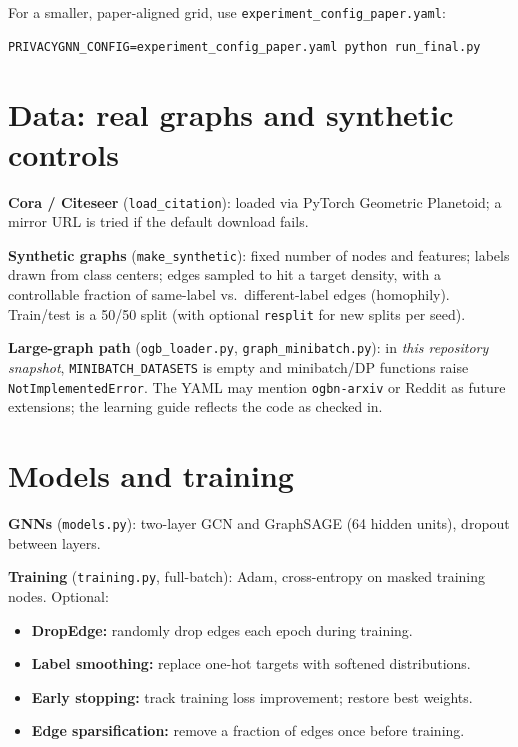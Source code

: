 \documentclass[11pt,a4paper]{article}
\begin{document}
For a smaller, paper-aligned grid, use \texttt{experiment\_config\_paper.yaml}:
\begin{verbatim}
PRIVACYGNN_CONFIG=experiment_config_paper.yaml python run_final.py
\end{verbatim}

\section{Data: real graphs and synthetic controls}

\textbf{Cora / Citeseer} (\texttt{load\_citation}): loaded via PyTorch Geometric Planetoid; a mirror URL is tried if the default download fails.

\textbf{Synthetic graphs} (\texttt{make\_synthetic}): fixed number of nodes and features; labels drawn from class centers; edges sampled to hit a target density, with a controllable fraction of same-label vs.\ different-label edges (homophily). Train/test is a 50/50 split (with optional \texttt{resplit} for new splits per seed).

\textbf{Large-graph path} (\texttt{ogb\_loader.py}, \texttt{graph\_minibatch.py}): in \emph{this repository snapshot}, \texttt{MINIBATCH\_DATASETS} is empty and minibatch/DP functions raise \texttt{NotImplementedError}. The YAML may mention \texttt{ogbn-arxiv} or Reddit as future extensions; the learning guide reflects the code as checked in.

\section{Models and training}

\textbf{GNNs} (\texttt{models.py}): two-layer GCN and GraphSAGE (64 hidden units), dropout between layers.

\textbf{Training} (\texttt{training.py}, full-batch): Adam, cross-entropy on masked training nodes. Optional:
\begin{itemize}
  \item \textbf{DropEdge:} randomly drop edges each epoch during training.
  \item \textbf{Label smoothing:} replace one-hot targets with softened distributions.
  \item \textbf{Early stopping:} track training loss improvement; restore best weights.
  \item \textbf{Edge sparsification:} remove a fraction of edges once before training.
\end{itemize}
\end{document}

